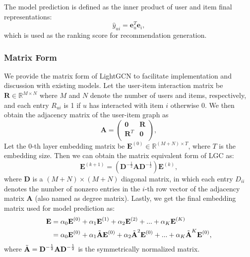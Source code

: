 The model prediction is defined as the inner product of user and item final representations: 
\begin{equation}
    \hat{y}_{ui} = \textbf{e}_u ^T \textbf{e}_i,
\end{equation}
which is used as the ranking score for recommendation generation. 

\subsubsection{Matrix Form} We provide the matrix form of LightGCN to facilitate implementation and discussion with existing models. Let the user-item interaction matrix be $\textbf{R} \in \mathbb{R}^{M\times N}$ where $M$ and $N$ denote the number of users and items, respectively, and each entry $R_{ui}$ is 1 if $u$ has interacted with item $i$ otherwise 0. We then obtain the adjacency matrix of the user-item graph as 
\begin{equation}
    \textbf{A}=
    \left(\begin{matrix}
    \textbf{0} & \textbf{R}\\
    \textbf{R}^{T} & \textbf{0}\\
    \end{matrix} \right),
\end{equation}
Let the $0$-th layer embedding matrix be $\textbf{E}^{(0)} \in \mathbb{R}^{ (M+N) \times T} $, where $T$ is the embedding size.  
Then we can obtain the matrix equivalent form of LGC as:
\begin{equation}
    \textbf{E}^{(k+1)} = (\textbf{D}^{-\frac{1}{2}} \textbf{A} \textbf{D}^{-\frac{1}{2}}) \textbf{E}^{(k)},
\end{equation}
where $\textbf{D}$ is a $(M+N)\times (M+N)$ diagonal matrix, in which each entry $D_{ii}$ denotes the number of nonzero entries in the $i$-th row vector of the  adjacency matrix $\textbf{A}$ (also named as degree matrix). Lastly, we get the final embedding matrix used for model prediction as:
\begin{equation}\label{eq:E_LGCN}
\begin{aligned}
    \textbf{E} &= \alpha_0 \textbf{E}^{(0)} + \alpha_1 \textbf{E}^{(1)} + \alpha_2 \textbf{E}^{(2)} + ... + \alpha_K \textbf{E}^{(K)} \\
    &= \alpha_0 \textbf{E}^{(0)} + \alpha_1 \Tilde{\textbf{A}}\textbf{E}^{(0)} + \alpha_2 \Tilde{\textbf{A}}^2\textbf{E}^{(0)} + ... + \alpha_K \Tilde{\textbf{A}}^K\textbf{E}^{(0)},
\end{aligned}
\end{equation}
where $\Tilde{\textbf{A}} = \textbf{D}^{-\frac{1}{2}} \textbf{A} \textbf{D}^{-\frac{1}{2}}$ is the symmetrically normalized matrix.

